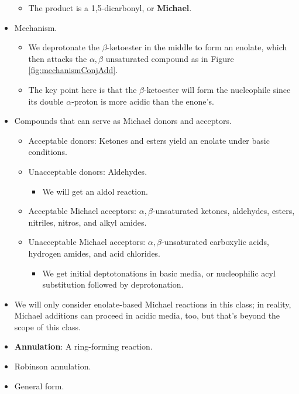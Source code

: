 \documentclass[../notes.tex]{subfiles}
\begin{document}
\begin{itemize}
\begin{itemize}
        \item The product is a 1,5-dicarbonyl, or \textbf{Michael}.
    \end{itemize}
    \item Mechanism.
    \begin{itemize}
        \item We deprotonate the $\beta$-ketoester in the middle to form an enolate, which then attacks the $\alpha,\beta$ unsaturated compound as in Figure \ref{fig:mechanismConjAdd}.
        \item The key point here is that the $\beta$-ketoester will form the nucleophile since its double $\alpha$-proton is more acidic than the enone's.
    \end{itemize}
    \item Compounds that can serve as Michael donors and acceptors.
    \begin{itemize}
        \item Acceptable donors: Ketones and esters yield an enolate under basic conditions.
        \item Unacceptable donors: Aldehydes.
        \begin{itemize}
            \item We will get an aldol reaction.
        \end{itemize}
        \item Acceptable Michael acceptors: $\alpha,\beta$-unsaturated ketones, aldehydes, esters, nitriles, nitros, and alkyl amides.
        \item Unacceptable Michael acceptors: $\alpha,\beta$-unsaturated carboxylic acids, hydrogen amides, and acid chlorides.
        \begin{itemize}
            \item We get initial deptotonations in basic media, or nucleophilic acyl substitution followed by deprotonation.
        \end{itemize}
    \end{itemize}
    \item We will only consider enolate-based Michael reactions in this class; in reality, Michael additions can proceed in acidic media, too, but that's beyond the scope of this class.
    \item \textbf{Annulation}: A ring-forming reaction.
    \item Robinson annulation.
    \item General form.
    \begin{center}
        \footnotesize

\end{center}
\end{itemize}
\end{document}
